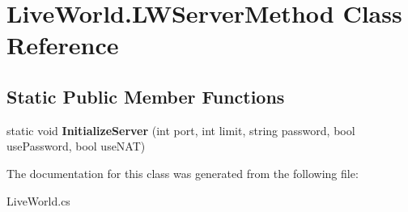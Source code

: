 \hypertarget{class_live_world_1_1_l_w_server_method}{}\section{Live\+World.\+L\+W\+Server\+Method Class Reference}
\label{class_live_world_1_1_l_w_server_method}
\subsection*{Static Public Member Functions}
\begin{DoxyCompactItemize}
\item 
\hypertarget{class_live_world_1_1_l_w_server_method_abcdc3a1af4761172fea9ce0e8cd7a3e4}{}static void {\bfseries Initialize\+Server} (int port, int limit, string password, bool use\+Password, bool use\+N\+A\+T)\label{class_live_world_1_1_l_w_server_method_abcdc3a1af4761172fea9ce0e8cd7a3e4}

\end{DoxyCompactItemize}


The documentation for this class was generated from the following file\+:\begin{DoxyCompactItemize}
\item 
Live\+World.\+cs\end{DoxyCompactItemize}

